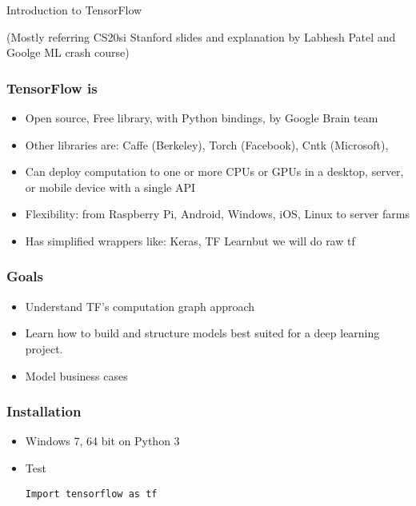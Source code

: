 \begin{frame}
  \begin{center}
    {\Large Introduction to TensorFlow}
    
    (Mostly referring CS20si Stanford slides and explanation by Labhesh Patel and Goolge ML crash course)
  \end{center}
\end{frame}


\begin{frame}[fragile] \frametitle{TensorFlow is}
\begin{itemize}
\item Open source, Free library, with Python bindings, by Google Brain team
\item Other libraries are: Caffe (Berkeley), Torch (Facebook), Cntk (Microsoft),
\item Can deploy computation to one or more CPUs or GPUs in a desktop, server, or mobile device with a single API
\item Flexibility: from Raspberry Pi, Android, Windows, iOS, Linux to server farms
\item Has simplified wrappers like: Keras, TF Learnbut we will do raw tf
\end{itemize}
\end{frame}


\begin{frame}[fragile] \frametitle{Goals}
\begin{itemize}
\item Understand TF's computation graph approach
\item Learn how to build and structure models best suited for a deep learning project.
\item Model business cases

\end{itemize}
\end{frame}


\begin{frame}[fragile] \frametitle{Installation}
\begin{itemize}
\item Windows 7, 64 bit on Python 3
\item Test
\begin{lstlisting}
Import tensorflow as tf
\end{lstlisting}
\end{itemize}
\end{frame}

